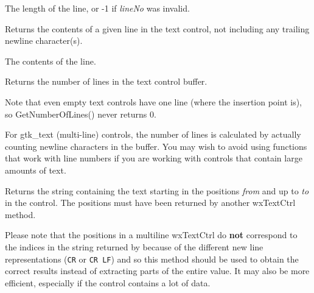 


The length of the line, or -1 if {\it lineNo} was invalid.


\label{wxtextctrlgetlinetext}


Returns the contents of a given line in the text control, not including
any trailing newline character(s).




The contents of the line.


\label{wxtextctrlgetnumberoflines}


Returns the number of lines in the text control buffer.


Note that even empty text controls have one line (where the insertion point
is), so GetNumberOfLines() never returns 0.

For gtk\_text (multi-line) controls, the number of lines is
calculated by actually counting newline characters in the buffer. You
may wish to avoid using functions that work with line numbers if you are
working with controls that contain large amounts of text.


\label{wxtextctrlgetrange}


Returns the string containing the text starting in the positions {\it from} and
up to {\it to} in the control. The positions must have been returned by another
wxTextCtrl method.

Please note that the positions in a multiline wxTextCtrl do {\bf not}
correspond to the indices in the string returned by
 because of the different new line
representations ({\tt CR} or {\tt CR LF}) and so this method should be used to
obtain the correct results instead of extracting parts of the entire value. It
may also be more efficient, especially if the control contains a lot of data.


